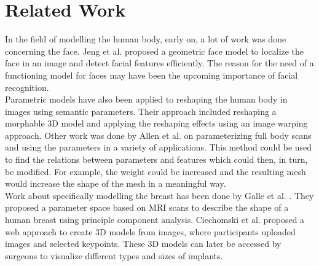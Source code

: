 \setcounter{chapter}{1}

\chapter{Related Work}
In the field of modelling the human body, early on, a lot of work was done concerning the face. Jeng et al. \cite{jeng1998facial} proposed a geometric face model to localize the face in an image and detect facial features efficiently. The reason for the need of a functioning model for faces may have been the upcoming importance of facial recognition.\\
Parametric models have also been applied to reshaping the human body in images using semantic parameters. \cite{zhou2010parametric} Their approach included reshaping a morphable 3D model and applying the reshaping effects using an image warping approach. Other work was done by Allen et al. \cite{allen2003space} on parameterizing full body scans and using the parameters in a variety of applications. This method could be used to find the relations between parameters and features which could then, in turn, be modified. For example, the weight could be increased and the resulting mesh would increase the shape of the mesh in a meaningful way.\\
Work about specifically modelling the breast has been done by Galle et al. \cite{gallo2010human}. They proposed a parameter space based on MRI scans to describe the shape of a human breast using principle component analysis. Ciechomski et al. \cite{de2012development} proposed a web approach to create 3D models from images, where participants uploaded images and selected keypoints. These 3D models can later be accessed by surgeons to visualize different types and sizes of implants.
